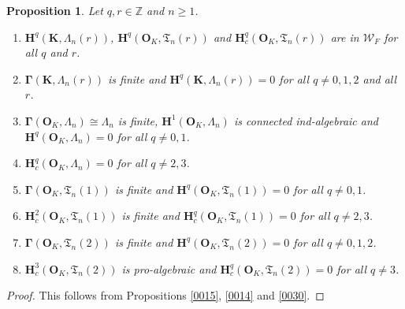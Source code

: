 \documentclass{amsart}
\newtheorem{Prop}[Thm]{Proposition}
\theoremstyle{remark}
\numberwithin{equation}{section}
\newcommand{\Z}{\mathbb{Z}}
\newcommand{\alg}[1]{\mathbf{#1}}
\begin{document}
\begin{Prop} \label{0031}
	Let $q, r \in \Z$ and $n \ge 1$.
	\begin{enumerate}
		\item \label{0032}
			$\alg{H}^{q}(\alg{K}, \Lambda_{n}(r))$,
			$\alg{H}^{q}(\alg{O}_{K}, \mathfrak{T}_{n}(r))$ and
			$\alg{H}^{q}_{c}(\alg{O}_{K}, \mathfrak{T}_{n}(r))$ are
			in $\mathcal{W}_{F}$ for all $q$ and $r$.
		\item \label{0033}
			$\alg{\Gamma}(\alg{K}, \Lambda_{n}(r))$ is finite and
			$\alg{H}^{q}(\alg{K}, \Lambda_{n}(r)) = 0$ for all $q \ne 0, 1, 2$ and all $r$.
		\item \label{0034}
			$\alg{\Gamma}(\alg{O}_{K}, \Lambda_{n}) \cong \Lambda_{n}$ is finite,
			$\alg{H}^{1}(\alg{O}_{K}, \Lambda_{n})$ is connected ind-algebraic and
			$\alg{H}^{q}(\alg{O}_{K}, \Lambda_{n}) = 0$ for all $q \ne 0, 1$.
		\item \label{0035}
			$\alg{H}^{q}_{c}(\alg{O}_{K}, \Lambda_{n}) = 0$ for all $q \ne 2, 3$.
		\item \label{0036}
			$\alg{\Gamma}(\alg{O}_{K}, \mathfrak{T}_{n}(1))$ is finite and
			$\alg{H}^{q}(\alg{O}_{K}, \mathfrak{T}_{n}(1)) = 0$ for all $q \ne 0, 1$.
		\item \label{0037}
			$\alg{H}^{2}_{c}(\alg{O}_{K}, \mathfrak{T}_{n}(1))$ is finite and
			$\alg{H}^{q}_{c}(\alg{O}_{K}, \mathfrak{T}_{n}(1)) = 0$ for all $q \ne 2, 3$.
		\item \label{0038}
			$\alg{\Gamma}(\alg{O}_{K}, \mathfrak{T}_{n}(2))$ is finite and
			$\alg{H}^{q}(\alg{O}_{K}, \mathfrak{T}_{n}(2)) = 0$ for all $q \ne 0, 1, 2$.
		\item \label{0039}
			$\alg{H}^{3}_{c}(\alg{O}_{K}, \mathfrak{T}_{n}(2))$ is pro-algebraic and
			$\alg{H}^{q}_{c}(\alg{O}_{K}, \mathfrak{T}_{n}(2)) = 0$ for all $q \ne 3$.
	\end{enumerate}
\end{Prop}

\begin{proof}
	This follows from Propositions \ref{0015}, \ref{0014} and \ref{0030}.
\end{proof}
\end{document}
